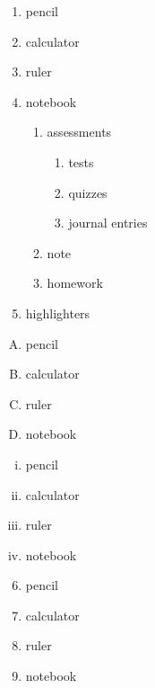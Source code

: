 \documentclass[11pt]{article}
\begin{document}
\begin{enumerate}
\item pencil
\item calculator
\item ruler
\item notebook
	\begin{enumerate}
	\item assessments
		\begin{enumerate}
		\item tests
		\item quizzes
		\item journal entries
		\end{enumerate}
	\item note
	\item homework
	\end{enumerate}
\item highlighters
\end{enumerate}

\vspace{1cm}

\begin{enumerate}[A.]
\item pencil
\item calculator
\item ruler
\item notebook
\end{enumerate}

\vspace{1cm}

\begin{enumerate}[i.]
\item pencil
\item calculator
\item ruler
\item notebook
\end{enumerate}

\pagebreak


\begin{enumerate}\setcounter{enumi}{5}
\item pencil
\item calculator
\item ruler
\item notebook
\end{enumerate}

\vspace{1cm}
\end{document}
